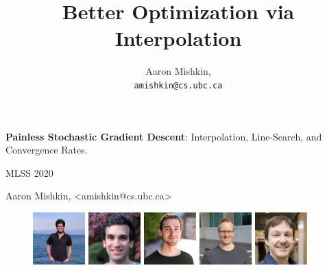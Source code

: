 \documentclass[notheorems]{beamer}
\title{Better Optimization via Interpolation}
\author{Aaron Mishkin, \\ \texttt{amishkin@cs.ubc.ca}}
\institute{University of British Columbia}
\date{}
\def\\{}%
\def\texttt#1{<#1>}%
\begin{document}
        \begin{frame}
        \vspace{1em}
        \begin{center}
            {\Large \textbf{Painless Stochastic Gradient Descent}: Interpolation, Line-Search, and Convergence Rates. \vspace{1em}}


            {\large MLSS 2020 \vspace{1em} }

            {\large Aaron Mishkin, \\ \texttt{amishkin@cs.ubc.ca} }
        \end{center}

        \vspace{2em}

        \begin{figure}
            \centering
            \includegraphics[width=0.18\textwidth]{collaborators/sharan}
            \includegraphics[width=0.18\textwidth]{collaborators/issam}
            \includegraphics[width=0.18\textwidth]{collaborators/gauthier}
            \includegraphics[width=0.18\textwidth]{collaborators/mark}
            \includegraphics[width=0.18\textwidth]{collaborators/simon}
        \end{figure}


\end{frame}
\end{document}
